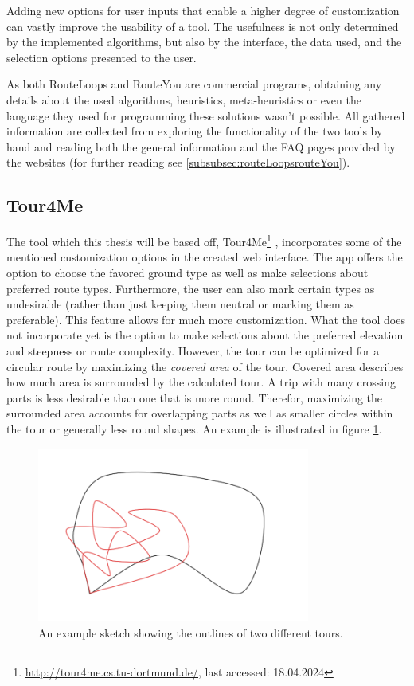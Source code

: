 Adding new options for user inputs that enable a higher degree of customization can vastly improve the usability of a tool. 
The usefulness is not only determined by the implemented algorithms, but also by the interface, the data used, and the selection options presented to the user. 

As both RouteLoops and RouteYou are commercial programs, obtaining any details about the used algorithms, heuristics, meta-heuristics or even the language they used for programming these solutions wasn't possible.
All gathered information are collected from exploring the functionality of the two tools by hand and reading both the general information and the FAQ pages provided by the websites (for further reading see \ref{subsubsec:routeLoopsrouteYou}). 

\subsection{Tour4Me}
\label{subsec:Tour4Me}

The tool which this thesis will be based off, Tour4Me\footnote{\url{http://tour4me.cs.tu-dortmund.de/}, last accessed: 18.04.2024} \cite{buchin_tour4me_2022}, incorporates some of the mentioned customization options in the created web interface. 
The app offers the option to choose the favored ground type as well as make selections about preferred route types.
Furthermore, the user can also mark certain types as undesirable (rather than just keeping them neutral or marking them as preferable).
This feature allows for much more customization.
What the tool does not incorporate yet is the option to make selections about the preferred elevation and steepness or route complexity.
However, the tour can be optimized for a circular route by maximizing the \textit{covered area} of the tour.
Covered area describes how much area is surrounded by the calculated tour. 
A trip with many crossing parts is less desirable than one that is more round.
Therefor, maximizing the surrounded area accounts for overlapping parts as well as smaller circles within the tour or generally less round shapes.
An example is illustrated in figure \ref{fig:coveredAreaSketch}. 

\begin{figure}[H]
	\begin{centering}
		\includegraphics[width=0.8\textwidth]{bilder/CoveredAreaSketch.png}
		\caption{An example sketch showing the outlines of two different tours.}
		\label{fig:coveredAreaSketch}
	\end{centering}
\end{figure}

